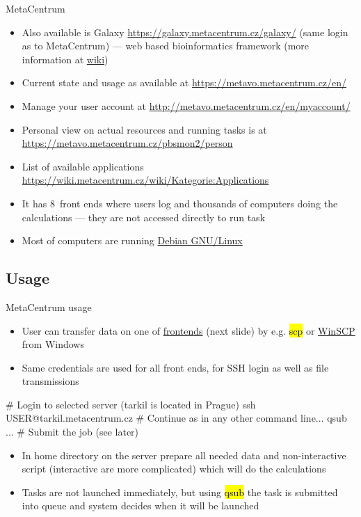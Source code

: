\documentclass[compress, ucs, xelatex, 11pt, xcolor=svgnames,
  hyperref={
    bookmarks=true,
    unicode=true,
    colorlinks=true,
    pdftitle={Linux, command line and MetaCentrum},
    plainpages=false,
    pdfauthor={Vojtech Zeisek},
    pdfsubject={Course about use of Linux command line, writing shell scripts and using MetaCentrum of CESNET},
    pdfcreator={XeLaTeX},
    pdfkeywords={Linux, GNU, BASH, shell, command line, MetaCentrum},
    linkcolor=DarkRed,
    anchorcolor=DarkBlue,
    citecolor=Indigo,
    filecolor=NavyBlue,
    menucolor=DarkMagenta,
    urlcolor=DarkBlue,
    pdftex},
  url={hyphens, lowtilde} %
  ]{beamer}
\renewcommand{\texttt}[1]{\hl{\ttfamily #1}}
\begin{document}
\begin{frame}{MetaCentrum}
  \begin{itemize}
    \item Also available is Galaxy \url{https://galaxy.metacentrum.cz/galaxy/} (same login as to MetaCentrum) --- web based bioinformatics framework (more information at \href{https://wiki.metacentrum.cz/wiki/Galaxy}{wiki})
    \item Current state and usage as available at \url{https://metavo.metacentrum.cz/en/}
    \item Manage your user account at \url{http://metavo.metacentrum.cz/en/myaccount/}
    \item Personal view on actual resources and running tasks is at \url{https://metavo.metacentrum.cz/pbsmon2/person}
    \item List of available applications \url{https://wiki.metacentrum.cz/wiki/Kategorie:Applications}
    \item It has 8~front ends where users log and thousands of computers doing the calculations --- they are not accessed directly to run task
    \item Most of computers are running \href{https://www.debian.org/}{Debian GNU/Linux}
  \end{itemize}
\end{frame}

\subsection{Usage}

\begin{frame}[fragile]{MetaCentrum usage}
  \begin{itemize}
    \item User can transfer data on one of \href{https://wiki.metacentrum.cz/wiki/Frontend}{frontends} (next slide) by e.g. \texttt{scp} or \href{https://winscp.net/}{WinSCP} from Windows
    \item Same credentials are used for all front ends, for SSH login as well as file transmissions
  \end{itemize}
  \begin{bashcode}
    # Login to selected server (tarkil is located in Prague)
    ssh USER@tarkil.metacentrum.cz
    # Continue as in any other command line...
    qsub ... # Submit the job (see later)
  \end{bashcode}
  \begin{itemize}
    \item In home directory on the server prepare all needed data and non-interactive script (interactive are more complicated) which will do the calculations
    \item Tasks are not launched immediately, but using \texttt{qsub} the task is submitted into queue and system decides when it will be launched
  \end{itemize}
\end{frame}
\end{document}
